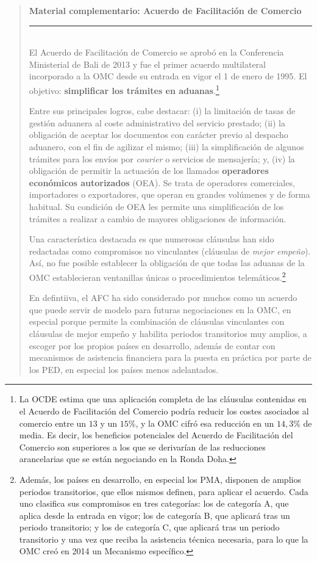 \documentclass[10pt,a4paper]{article}
\newenvironment{specialblock}[1]{%
      \begin{quote} %
      \small %
      \noindent\textbf{#1}\\[-0.3em] %
      \rule{\linewidth}{0.4pt}\\[0.6em]}{
      \end{quote}}
\begin{document}
\begin{specialblock}{\textbf{Material complementario:} Acuerdo de Facilitación de Comercio}
  El Acuerdo de Facilitación de Comercio se aprobó en la Conferencia Ministerial de Bali de 2013 y fue el primer acuerdo multilateral incorporado a la OMC desde su entrada en vigor el 1 de enero de 1995. El objetivo: \textbf{simplificar los trámites en aduanas}.\footnote{%
    La OCDE estima que una aplicación completa de las cláusulas contenidas en el Acuerdo de Facilitación del Comercio podría reducir los costes asociados al comercio entre un $13$ y un $15\%$, y la OMC cifró esa reducción en un $14,3\%$ de media. Es decir, los beneficios potenciales del Acuerdo de Facilitación del Comercio son superiores a los que se derivarían de las reducciones arancelarias que se están negociando en la Ronda Doha.
  } 
  
  Entre sus principales logros, cabe destacar: (i) la limitación de tasas de gestión aduanera al coste administrativo del servicio prestado; (ii) la obligación de aceptar los documentos con carácter previo al despacho aduanero, con el fin de agilizar el mismo; (iii) la simplificación de algunos trámites para los envíos por \textit{courier} o servicios de mensajería; y, (iv) la obligación de permitir la actuación de los llamados \textbf{operadores económicos autorizados} (OEA). Se trata de operadores comerciales, importadores o exportadores, que operan en grandes volúmenes y de forma habitual. Su condición de OEA les permite una simplificación de los trámites a realizar a cambio de mayores obligaciones de información.

  Una característica destacada es que numerosas cláusulas han sido redactadas como compromisos no vinculantes (cláusulas de \textit{mejor empeño}). Así, no fue posible establecer la obligación de que todas las aduanas de la OMC establecieran ventanillas únicas o procedimientos telemáticos.\footnote{%
    Además, los países en desarrollo, en especial los PMA, disponen de amplios periodos transitorios, que ellos mismos definen, para aplicar el acuerdo. Cada uno clasifica sus compromisos en tres categorías: los de categoría A, que aplica desde la entrada en vigor; los de categoría B, que aplicará tras un periodo transitorio; y los de categoría C, que aplicará tras un periodo transitorio y una vez que reciba la asistencia técnica necesaria, para lo que la OMC creó en 2014 un Mecanismo específico.
  }

  En defintiiva, el AFC ha sido considerado por muchos como un acuerdo que puede servir de modelo para futuras negociaciones en la OMC, en especial porque permite la combinación de cláusulas vinculantes con cláusulas de mejor empeño y habilita periodos transitorios muy amplios, a escoger por los propios países en desarrollo, además de contar con mecanismos de asistencia financiera para la puesta en práctica por parte de los PED, en especial los países menos adelantados.
\end{specialblock}
\end{document}
